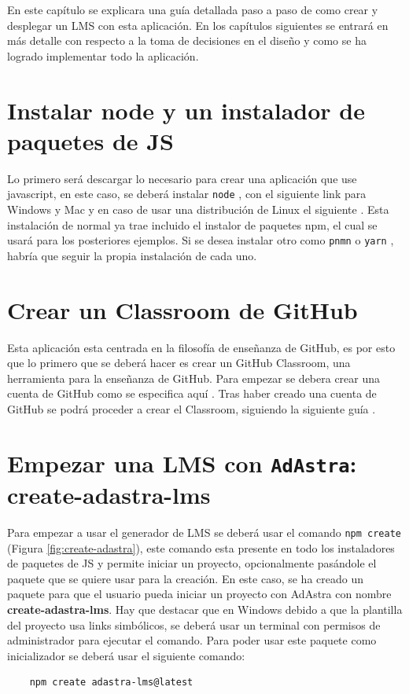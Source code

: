 En este capítulo se explicara una guía detallada paso a paso de como crear y desplegar un LMS con esta aplicación. En los capítulos siguientes se entrará en más detalle con respecto a la toma de decisiones en el diseño y como se ha logrado implementar todo la aplicación.

\section{Instalar node y un instalador de paquetes de JS}

Lo primero será descargar lo necesario para crear una aplicación que use javascript, en este caso, se deberá instalar \verb|node| \cite{nodejs}, con el siguiente link \cite{node-install} para Windows y Mac y en caso de usar una distribución de Linux el siguiente \cite{node-install-linux}. Esta instalación de normal ya trae incluido el instalor de paquetes npm, el cual se usará para los posteriores ejemplos. Si se desea instalar otro como \verb|pnmn| \cite{pnpm} o \verb|yarn| \cite{yarn}, habría que seguir la propia instalación de cada uno.

\section{Crear un Classroom de GitHub}

Esta aplicación esta centrada en la filosofía de enseñanza de GitHub, es por esto que lo primero que se deberá hacer es crear un GitHub Classroom, una herramienta para la enseñanza de GitHub. Para empezar se debera crear una cuenta de GitHub como se especifica aquí \cite{github-account}. Tras haber creado una cuenta de GitHub se podrá proceder a crear el Classroom, siguiendo la siguiente guía \cite{github-classroom-create}.

\section{Empezar una LMS con {\tt AdAstra}: create-adastra-lms}

Para empezar a usar el generador de LMS se deberá usar el comando \verb|npm create |(Figura \ref{fig:create-adastra}), este comando esta presente en todo los instaladores de paquetes de JS y permite iniciar un proyecto, opcionalmente pasándole el paquete que se quiere usar para la creación. En este caso, se ha creado un paquete para que el usuario pueda iniciar un proyecto con AdAstra con nombre \textbf{create-adastra-lms}. Hay que destacar que en Windows debido a que la plantilla del proyecto usa links simbólicos, se deberá usar un terminal con permisos de administrador para ejecutar el comando. Para poder usar este paquete como inicializador se deberá usar el siguiente comando:
\begin{verbatim}
    npm create adastra-lms@latest
\end{verbatim}

